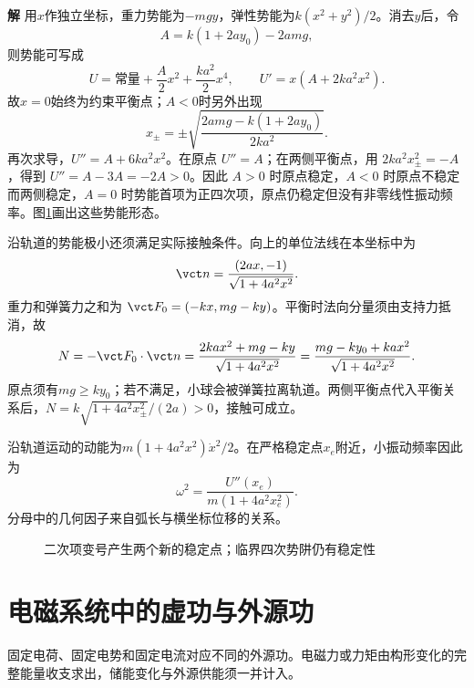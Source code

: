 \documentclass[11pt,openany,fontset=fandol]{ctexbook}
\theoremstyle{definition}\newtheorem{example}{例}[chapter]\newtheorem{exercise}{习题}[chapter]
\newcommand{\SolutionStart}{\par\medskip\ifdim\pagetotal>0pt\ifdim\dimexpr\pagegoal-\pagetotal\relax<3\baselineskip\newpage\fi\fi\noindent\textbf{解}\quad\ignorespaces}
\newenvironment{solution}{\SolutionStart}{\par\medskip}
\begin{document}
\begin{solution}
用$x$作独立坐标，重力势能为$-mgy$，弹性势能为$k(x^2+y^2)/2$。消去$y$后，令
\[
 A=k(1+2ay_0)-2amg,
\]
则势能可写成
\[
 U=\text{常量}+\frac A2x^2+\frac{ka^2}{2}x^4,
 \qquad U'=x(A+2ka^2x^2).
\]
故$x=0$始终为约束平衡点；$A<0$时另外出现
\[
 \boxed{x_\pm=\pm\sqrt{\frac{2amg-k(1+2ay_0)}{2ka^2}}}.
\]
再次求导，$U''=A+6ka^2x^2$。在原点 $U''=A$；在两侧平衡点，用 $2ka^2x_\pm^2=-A$，得到 $U''=A-3A=-2A>0$。因此 $A>0$ 时原点稳定，$A<0$ 时原点不稳定而两侧稳定，$A=0$ 时势能首项为正四次项，原点仍稳定但没有非零线性振动频率。图\ref{mp5:fig:hw:l5-35-s}画出这些势能形态。

沿轨道的势能极小还须满足实际接触条件。向上的单位法线在本坐标中为
\[
 \vct n=\frac{(2ax,-1)}{\sqrt{1+4a^2x^2}}.
\]
重力和弹簧力之和为 $\vct F_0=(-kx,mg-ky)$。平衡时法向分量须由支持力抵消，故
\[
N=-\vct F_0\cdot\vct n
=\frac{2kax^2+mg-ky}{\sqrt{1+4a^2x^2}}
=\frac{mg-ky_0+ka x^2}{\sqrt{1+4a^2x^2}}.
\]
原点须有$mg\ge ky_0$；若不满足，小球会被弹簧拉离轨道。两侧平衡点代入平衡关系后，$N=k\sqrt{1+4a^2x_\pm^2}/(2a)>0$，接触可成立。

沿轨道运动的动能为$m(1+4a^2x^2)\dot x^2/2$。在严格稳定点$x_e$附近，小振动频率因此为
\[
 \omega^2=\frac{U''(x_e)}{m(1+4a^2x_e^2)}.
\]
分母中的几何因子来自弧长与横坐标位移的关系。


\begin{figure}[H]\centering
{}
\caption{二次项变号产生两个新的稳定点；临界四次势阱仍有稳定性}\label{mp5:fig:hw:l5-35-s}
\end{figure}

\end{solution}

\section{电磁系统中的虚功与外源功}
固定电荷、固定电势和固定电流对应不同的外源功。电磁力或力矩由构形变化的完整能量收支求出，储能变化与外源供能须一并计入。
\end{document}
